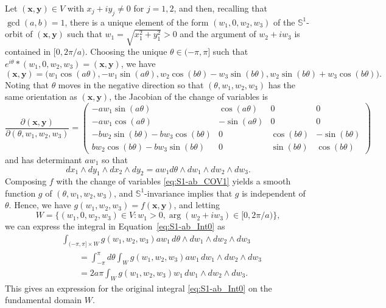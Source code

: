 \documentclass[twoside]{amsart}
\theoremstyle{definition}
\theoremstyle{remark}
\numberwithin{equation}{section}
\newcommand{\Sp}{\mathbb{S}}
\begin{document}
Let $(\mathbf{x}, \mathbf{y}) \in V$ with $x_j + i y_j \neq 0$ for $j = 1,2$, and then, recalling that $\gcd(a, b) = 1$, there is a unique
element of the form $(w_1, 0, w_2, w_3)$ of the $\Sp^1$-orbit of $(\mathbf{x}, \mathbf{y})$ such that $w_1 = \sqrt{x_1^2 + y_1^2} > 0$ and
the argument of $w_2 + i w_3$ is contained in $[0, 2\pi/a)$. Choosing the unique $\theta\in(-\pi,\pi]$ such that
$e^{i\theta}\ast(w_1, 0, w_2, w_3) = (\mathbf{x}, \mathbf{y})$, we have
\begin{equation}
\label{eq:S1-ab_COV1}
    (\mathbf{x}, \mathbf{y})
    =
    \big(   w_1 \cos(a\theta),
            - w_1 \sin(a\theta),
            w_2 \cos(b\theta) - w_3 \sin(b\theta),
            w_2 \sin(b\theta) + w_3 \cos(b\theta)
    \big).
\end{equation}
Noting that $\theta$ moves in the negative direction so that $(\theta, w_1, w_2, w_3)$ has the same orientation as $(\mathbf{x}, \mathbf{y})$,
the Jacobian of the change of variables is
\begin{equation}
\label{eq:S1-ab_COV1Jacobian}
    \frac{\partial (\mathbf{x}, \mathbf{y})}{ \partial (\theta, w_1, w_2, w_3)}
    =
    \begin{pmatrix}
        - a w_1\sin(a\theta)    &   \cos(a\theta)     &   0   &   0
        \\
        - a w_1\cos(a\theta)    &   - \sin(a\theta)     &   0   &   0
        \\
        - b w_2 \sin(b\theta) - b w_3 \cos(b\theta)   & 0   &   \cos(b\theta)   &   -\sin(b\theta)
        \\
        b w_2 \cos(b\theta) - b w_3 \sin(b\theta)     & 0   &   \sin(b\theta)   &   \cos(b\theta)
    \end{pmatrix}
\end{equation}
and has determinant $a w_1$ so that
\[
    dx_1\wedge dy_1 \wedge dx_2 \wedge dy_2
    =
    a w_1 d\theta \wedge dw_1 \wedge dw_2 \wedge dw_3.
\]
Composing $f$ with the change of variables \eqref{eq:S1-ab_COV1} yields a smooth function $g$ of $(\theta, w_1, w_2, w_3)$,
and $\Sp^1$-invariance implies that $g$ is independent of $\theta$. Hence, we have $g(w_1, w_2, w_3) = f(\mathbf{x}, \mathbf{y})$, and letting
\[
    W = \{ (w_1, 0, w_2, w_3) \in V : w_1 > 0, \arg (w_2 + i w_3) \in [0,2\pi/a) \},
\]
we can express the integral in Equation~\eqref{eq:S1-ab_Int0} as
\begin{align}
    \nonumber
    &\int_{(-\pi,\pi]\times W} g(w_1, w_2, w_3) a w_1 \, d\theta \wedge dw_1 \wedge dw_2 \wedge dw_3
    \\
    \nonumber
    &\qquad=    \int_{-\pi}^{\pi} d\theta \int_W g(w_1, w_2, w_3) a w_1 \, dw_1 \wedge dw_2 \wedge dw_3
    \\
    \label{eq:S1-ab_Int1}
    &\qquad=    2a\pi \int_W g(w_1, w_2, w_3) w_1 \, dw_1 \wedge dw_2 \wedge dw_3.
\end{align}
This gives an expression for the original integral \eqref{eq:S1-ab_Int0} on the fundamental domain $W$.
\end{document}
